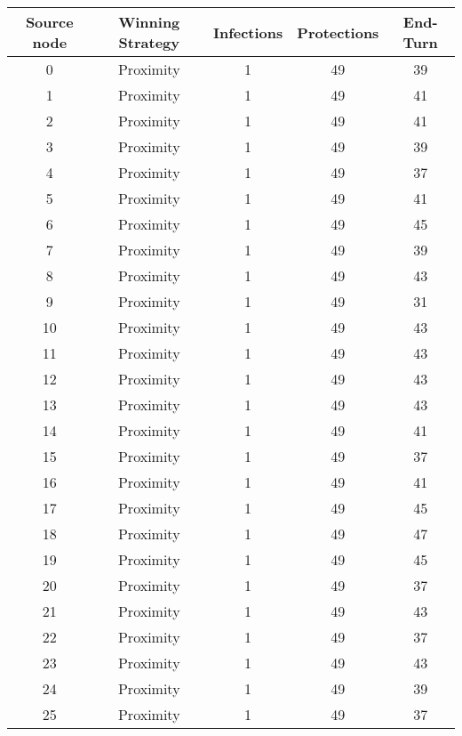 \documentclass[results.tex]{subfiles}
\begin{document}
\begin{center}
  \begin{tabular}{| c || c | c | c | c |}
    \hline
    {\bfseries Source node} & {\bfseries Winning Strategy} & {\bfseries Infections} & {\bfseries Protections} & {\bfseries End-Turn} \\  %
    \hline\hline
    0 & Proximity & 1 & 49 & 39 \\ 
    \hline
    1 & Proximity & 1 & 49 & 41 \\ 
    \hline
    2 & Proximity & 1 & 49 & 41 \\ 
    \hline
    3 & Proximity & 1 & 49 & 39 \\ 
    \hline
    4 & Proximity & 1 & 49 & 37 \\ 
    \hline
    5 & Proximity & 1 & 49 & 41 \\ 
    \hline
    6 & Proximity & 1 & 49 & 45 \\ 
    \hline
    7 & Proximity & 1 & 49 & 39 \\ 
    \hline
    8 & Proximity & 1 & 49 & 43 \\ 
    \hline
    9 & Proximity & 1 & 49 & 31 \\ 
    \hline
    10 & Proximity & 1 & 49 & 43 \\ 
    \hline
    11 & Proximity & 1 & 49 & 43 \\ 
    \hline
    12 & Proximity & 1 & 49 & 43 \\ 
    \hline
    13 & Proximity & 1 & 49 & 43 \\ 
    \hline
    14 & Proximity & 1 & 49 & 41 \\ 
    \hline
    15 & Proximity & 1 & 49 & 37 \\ 
    \hline
    16 & Proximity & 1 & 49 & 41 \\ 
    \hline
    17 & Proximity & 1 & 49 & 45 \\ 
    \hline
    18 & Proximity & 1 & 49 & 47 \\ 
    \hline
    19 & Proximity & 1 & 49 & 45 \\ 
    \hline
    20 & Proximity & 1 & 49 & 37 \\ 
    \hline
    21 & Proximity & 1 & 49 & 43 \\ 
    \hline
    22 & Proximity & 1 & 49 & 37 \\ 
    \hline
    23 & Proximity & 1 & 49 & 43 \\ 
    \hline
    24 & Proximity & 1 & 49 & 39 \\ 
    \hline
    25 & Proximity & 1 & 49 & 37 \\ 

\end{tabular}
\end{center}
\end{document}
